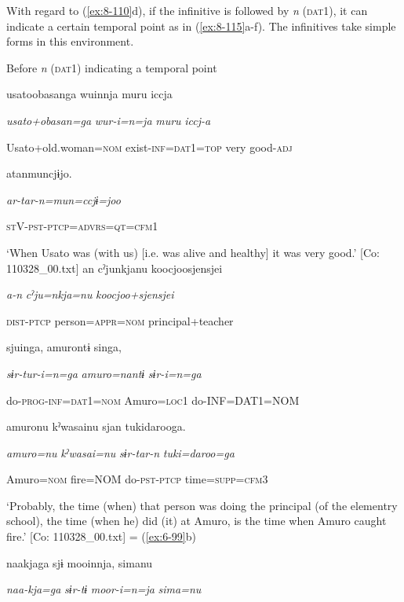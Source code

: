   With regard to (\ref{ex:8-110}d), if the infinitive is followed by \textit{n} (\textsc{dat}1), it can indicate a certain temporal point as in (\ref{ex:8-115}a-f). The infinitives take simple forms in this environment.

\ea\label{ex:8-115}
  Before \textit{n} (\textsc{dat}1) indicating a temporal point

\ea {\TM}
\glll  usatoobasanga  wuinnja  muru  iccja

      \textit{usato+obasan=ga}  \textit{wur-i=n=ja}  \textit{muru}  \textit{iccj-a}

      Usato+old.woman=\textsc{nom}  exist-\textsc{inf}=\textsc{dat}1=\textsc{top}  very  good-\textsc{adj}

      atanmuncjɨjo.

      \textit{ar-tar-n=mun=ccjɨ=joo}

      \textsc{st}V-\textsc{pst}-\textsc{ptcp}=\textsc{advrs}=\textsc{qt}=\textsc{cfm1}

\glt ‘When Usato was (with us) [i.e. was alive and healthy] it was very good.’ [Co: 110328\_00.txt]
\ex {\TM}
\glll  an  cˀjunkjanu  {\textbar}koocjoosjensjei{\textbar}

      \textit{a-n}  \textit{cˀju=nkja=nu}  \textit{koocjoo+sjensjei}

      \textsc{dist}-\textsc{ptcp}  person=\textsc{appr}=\textsc{nom}  principal+teacher

      sjuinga,  amurontɨ  singa,

      \textit{sɨr-tur-i=n=ga}  \textit{amuro=nantɨ}  \textit{sɨr-i=n=ga}

      do-\textsc{prog}-\textsc{inf}=\textsc{dat}1=\textsc{nom}  Amuro=\textsc{loc}1  do-INF=DAT1=NOM

      amuronu  kˀwasainu  sjan  tukidarooga.

      \textit{amuro=nu}  \textit{kˀwasai=nu}  \textit{sɨr-tar-n}  \textit{tuki=daroo=ga}

      Amuro=\textsc{nom}  fire=NOM  do-\textsc{pst}-\textsc{ptcp}  time=\textsc{supp}=\textsc{cfm}3

\glt ‘Probably, the time (when) that person was doing the principal (of the elementry school), the time (when he) did (it) at Amuro, is the time when Amuro caught fire.’ [Co: 110328\_00.txt]
 = (\ref{ex:6-99}b)

    {\TM}
\glll  naakjaga  sjɨ  mooinnja,  simanu

      \textit{naa-kja=ga}  \textit{sɨr-tɨ}  \textit{moor-i=n=ja}  \textit{sima=nu}

